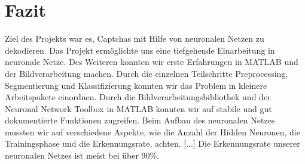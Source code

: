 \section{Fazit}
Ziel des Projekts war es, Captchas mit Hilfe von neuronalen Netzen zu dekodieren. Das Projekt ermöglichte uns eine tiefgehende Einarbeitung in neuronale Netze. Des Weiteren konnten wir erste Erfahrungen in MATLAB und der Bildverarbeitung machen. Durch die einzelnen Teilschritte Preprocessing, Segmentierung und Klassifizierung konnten wir das Problem in kleinere Arbeitspakete einordnen. Durch die Bildverarbeitungsbibliothek und der Neuronal Network Toolbox in MATLAB konnten wir auf stabile und gut dokumentierte Funktionen zugreifen. Beim Aufbau des neuronalen Netzes mussten wir auf verschiedene Aspekte, wie die Anzahl der Hidden Neuronen, die Trainingsphase und die Erkennungsrate, achten. [...] Die Erkennungsrate unserer neuronalen Netzes ist meist bei über 90\%.